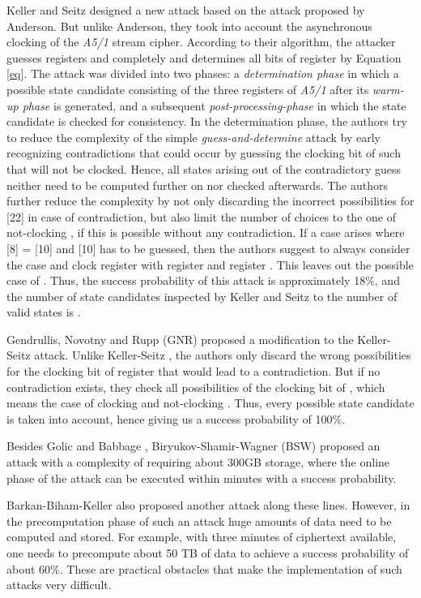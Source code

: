 \documentclass{llncs}
\begin{document}
Keller and Seitz designed a new attack \cite{[KS01]} based on the attack proposed by Anderson. But unlike Anderson, they took into account the asynchronous clocking of the \emph{A5/1} stream cipher. According to their algorithm, the attacker guesses registers  and  completely and determines all bits of register  by Equation \ref{eq}. The attack was divided into two phases: a \emph{determination phase} in which a possible state candidate consisting of the three registers of \emph{A5/1} after its \emph{warm-up phase} \cite{[Bri]} is generated, and a subsequent \emph{post-processing-phase} in which the state candidate is checked for consistency. In the determination phase, the authors try to reduce the complexity of the simple \emph{guess-and-determine} attack by early recognizing contradictions that could occur by guessing the clocking bit of  such that  will not be clocked. Hence, all states arising out of the contradictory guess neither need to be computed further on nor checked afterwards. The authors further reduce the complexity by not only discarding the incorrect possibilities for [22] in case of contradiction, but also limit the number of choices to the one of not-clocking , if this is possible without any contradiction. If a case arises where [8] = [10] and [10] has to be guessed, then the authors suggest to always consider the case  and clock register  with register  and register . This leaves out the possible case of . Thus, the success probability of this attack is approximately 18\%, and the number of state candidates inspected by Keller and Seitz to the number of valid states is .

Gendrullis, Novotny and Rupp \cite{[Rupp]} (GNR) proposed a modification to the Keller-Seitz attack. Unlike Keller-Seitz \cite{[KS01]}, the authors only discard the wrong possibilities for the clocking bit of register  that would lead to a contradiction. But if no contradiction exists, they check all possibilities of the clocking bit of , which means the case of clocking and not-clocking . Thus, every possible state candidate is taken into account, hence giving us a success probability of 100\%.

Besides Golic \cite{[Golic]} and Babbage \cite{[Bab]}, Biryukov-Shamir-Wagner \cite{[Bir]} (BSW) proposed an attack with a complexity of  requiring about 300GB storage, where the online phase of the attack can be executed within minutes with a  success probability. 

Barkan-Biham-Keller \cite{[Bar]} also proposed another attack along these lines.  However, in the precomputation phase of such an attack huge amounts of data need to be computed and stored. For example, with three minutes of ciphertext available, one needs to precompute about 50 TB of data to achieve a success probability of about 60\%. These are practical obstacles that make the implementation of such attacks very difficult.
\end{document}
